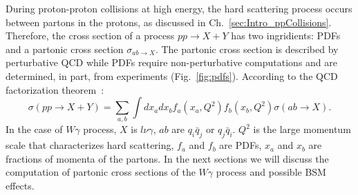 During proton-proton collisions at high energy, the hard scattering process occurs between partons in the protons, as discussed in Ch.~\ref{sec:Intro_ppCollisions}. Therefore, the cross section of a process $pp \rightarrow X+Y$ has two ingridients: PDFs and a partonic cross section $\sigma_{ab\rightarrow X}$. The partonic cross section is described by perturbative QCD while PDFs require non-perturbative computations and are determined, in part, from experiments (Fig.~\ref{fig:pdfs}). According to the QCD factorization theorem~\cite{ref_HardScattering}:\\
\begin{equation}\label{eq:ppCS_general}
  \sigma(pp \rightarrow X+Y)= \sum_{a,b} \int dx_a dx_b f_a(x_a,Q^2) f_b(x_b, Q^2) \sigma(ab \rightarrow X).
\end{equation}
In the case of $W\gamma$ process, $X$ is $l \nu \gamma$, $ab$ are $q_i \bar{q}_j$ or $q_j \bar{q}_i$. $Q^2$ is the large momentum scale that characterizes hard scattering, $f_a$ and $f_b$ are PDFs, $x_a$ and $x_b$ are fractions of momenta of the partons. In the next sections we will discuss the computation of partonic cross sections of the $W\gamma$ process and possible BSM effects.\\

